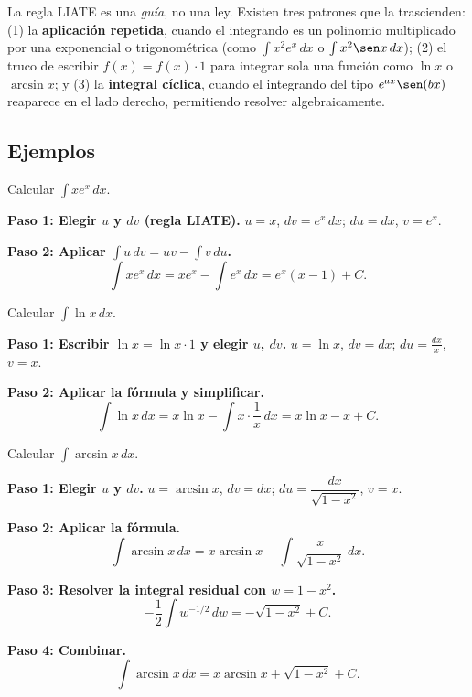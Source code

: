 \begin{rem}
La regla LIATE es una \emph{guía}, no una ley. Existen tres patrones que la
trascienden: (1) la \textbf{aplicación repetida}, cuando el integrando es un
polinomio multiplicado por una exponencial o trigonométrica (como $\int x^2
e^x\,dx$ o $\int x^2 \sen x\,dx$); (2) el truco de escribir $f(x) = f(x)
\cdot 1$ para integrar sola una función como $\ln x$ o $\arcsin x$; y (3)
la \textbf{integral cíclica}, cuando el integrando del tipo $e^{ax}\sen(bx)$
reaparece en el lado derecho, permitiendo resolver algebraicamente.
\end{rem}

\subsection{Ejemplos}

\begin{example}
Calcular $\displaystyle\int x e^x\, dx$.

\begin{myproof}

\textbf{Paso 1: Elegir $u$ y $dv$ (regla LIATE).}
$u = x$, $dv = e^x\,dx$; $du = dx$, $v = e^x$.

\textbf{Paso 2: Aplicar $\int u\,dv = uv - \int v\,du$.}
\[
\boxed{\int x e^x\, dx = x e^x - \int e^x\, dx = e^x(x-1) + C.}
\]
\end{myproof}
\end{example}

\begin{example}
Calcular $\displaystyle\int \ln x\, dx$.

\begin{myproof}

\textbf{Paso 1: Escribir $\ln x = \ln x \cdot 1$ y elegir $u$, $dv$.}
$u = \ln x$, $dv = dx$; $du = \frac{dx}{x}$, $v = x$.

\textbf{Paso 2: Aplicar la fórmula y simplificar.}
\[
\boxed{\int \ln x\, dx = x\ln x - \int x\cdot\frac{1}{x}\, dx = x\ln x - x + C.}
\]
\end{myproof}
\end{example}

\begin{example}
Calcular $\displaystyle\int \arcsin x\, dx$.

\begin{myproof}

\textbf{Paso 1: Elegir $u$ y $dv$.}
$u = \arcsin x$, $dv = dx$; $du = \dfrac{dx}{\sqrt{1-x^2}}$, $v = x$.

\textbf{Paso 2: Aplicar la fórmula.}
\[
\int \arcsin x\, dx = x\arcsin x - \int \frac{x}{\sqrt{1-x^2}}\, dx.
\]

\textbf{Paso 3: Resolver la integral residual con $w = 1-x^2$.}
\[
-\frac{1}{2}\int w^{-1/2}\, dw = -\sqrt{1-x^2}+C.
\]

\textbf{Paso 4: Combinar.}
\[
\boxed{\int \arcsin x\, dx = x\arcsin x + \sqrt{1-x^2} + C.}
\]
\end{myproof}
\end{example}

